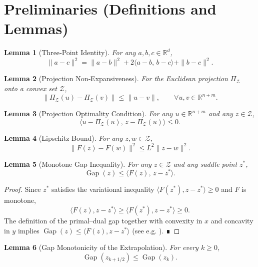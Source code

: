 \documentclass{article}
\newtheorem{lemma}{Lemma}
\newcommand{\R}{\mathbb{R}}
\newcommand{\gap}{\operatorname{Gap}}
\begin{document}
\section*{Preliminaries (Definitions and Lemmas)}
\begin{lemma}[Three‑Point Identity]\label{lem:3pt}
For any $a,b,c\in\R^{d}$,
\[
\|a-c\|^{2}= \|a-b\|^{2}+2\langle a-b,\,b-c\rangle+\|b-c\|^{2}.
\]
\end{lemma}
\begin{lemma}[Projection Non‑Expansiveness]\label{lem:proj}
For the Euclidean projection $\Pi_{\mathcal Z}$ onto a convex set $\mathcal Z$,
\[
\|\Pi_{\mathcal Z}(u)-\Pi_{\mathcal Z}(v)\|\le\|u-v\|,\qquad\forall u,v\in\R^{n+m}.
\]
\end{lemma}
\begin{lemma}[Projection Optimality Condition]\label{lem:proj_opt}
For any $u\in\R^{n+m}$ and any $z\in\mathcal Z$,
\[
\langle u-\Pi_{\mathcal Z}(u),\,z-\Pi_{\mathcal Z}(u)\rangle\le0 .
\]
\end{lemma}
\begin{lemma}[Lipschitz Bound]\label{lem:lip}
For any $z,w\in\mathcal Z$,
\[
\|F(z)-F(w)\|^{2}\le L^{2}\|z-w\|^{2}.
\]
\end{lemma}
\begin{lemma}[Monotone Gap Inequality]\label{lem:gap}
For any $z\in\mathcal Z$ and any saddle point $z^{*}$,
\[
\gap(z)\le\langle F(z),\,z-z^{*}\rangle .
\]
\end{lemma}
\begin{proof}
Since $z^{*}$ satisfies the variational inequality
$\langle F(z^{*}),z-z^{*}\rangle\ge0$ and $F$ is monotone,
\[
\langle F(z),z-z^{*}\rangle\ge\langle F(z^{*}),z-z^{*}\rangle\ge0 .
\]
The definition of the primal–dual gap together with convexity in $x$ and concavity in $y$
implies $\gap(z)\le\langle F(z),z-z^{*}\rangle$ (see e.g. \cite[Prop.~2.1]{nemirovski2004prox}).  ∎
\end{proof}
\begin{lemma}[Gap Monotonicity of the Extrapolation]\label{lem:gap_mon}
For every $k\ge0$,
\[
\gap(z_{k+1/2})\le\gap(z_{k}) .
\]
\end{lemma}
\end{document}
